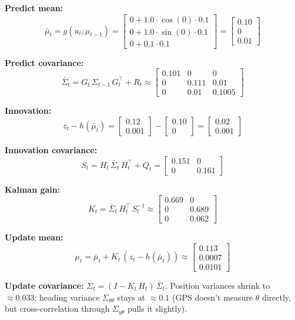 \documentclass[11pt,a4paper]{article}
\begin{document}
\textbf{Predict mean:}
\[
\bar{\mu}_t = g(u_t, \mu_{t-1}) = \begin{bmatrix}0 + 1.0 \cdot \cos(0) \cdot 0.1 \\ 0 + 1.0 \cdot \sin(0) \cdot 0.1 \\ 0 + 0.1 \cdot 0.1\end{bmatrix} = \begin{bmatrix}0.10 \\ 0 \\ 0.01\end{bmatrix}
\]

\textbf{Predict covariance:}
\[
\bar{\Sigma}_t = G_t\, \Sigma_{t-1}\, G_t^\top + R_t \approx \begin{bmatrix}0.101 & 0 & 0 \\ 0 & 0.111 & 0.01 \\ 0 & 0.01 & 0.1005\end{bmatrix}
\]

\textbf{Innovation:}
\[
z_t - h(\bar{\mu}_t) = \begin{bmatrix}0.12 \\ 0.001\end{bmatrix} - \begin{bmatrix}0.10 \\ 0\end{bmatrix} = \begin{bmatrix}0.02 \\ 0.001\end{bmatrix}
\]

\textbf{Innovation covariance:}
\[
S_t = H_t\, \bar{\Sigma}_t\, H_t^\top + Q_t = \begin{bmatrix}0.151 & 0 \\ 0 & 0.161\end{bmatrix}
\]

\textbf{Kalman gain:}
\[
K_t = \bar{\Sigma}_t\, H_t^\top\, S_t^{-1} \approx \begin{bmatrix}0.669 & 0 \\ 0 & 0.689 \\ 0 & 0.062\end{bmatrix}
\]

\textbf{Update mean:}
\[
\mu_t = \bar{\mu}_t + K_t\,(z_t - h(\bar{\mu}_t)) \approx \begin{bmatrix}0.113 \\ 0.0007 \\ 0.0101\end{bmatrix}
\]

\textbf{Update covariance:} $\Sigma_t = (I - K_t\, H_t)\,\bar{\Sigma}_t$. Position variances shrink to $\approx 0.033$; heading variance $\Sigma_{\theta\theta}$ stays at $\approx 0.1$ (GPS doesn't measure $\theta$ directly, but cross-correlation through $\Sigma_{y\theta}$ pulls it slightly).
\end{document}
